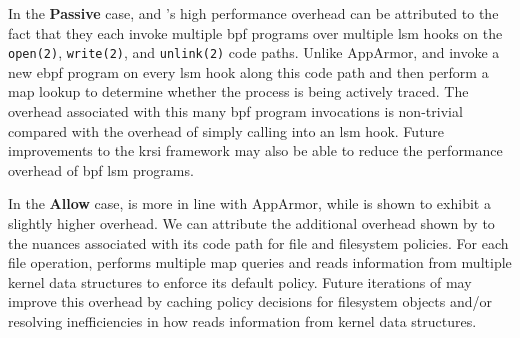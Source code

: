 

In the \textbf{Passive} case, \bpfbox{} and \bpfcontain{}'s high performance overhead can
be attributed to the fact that they each invoke multiple \gls{bpf} programs over multiple
\gls{lsm} hooks on the \texttt{open(2)}, \texttt{write(2)}, and \texttt{unlink(2)} code
paths. Unlike AppArmor, \bpfbox{} and \bpfcontain{} invoke a new \gls{ebpf} program on
every \gls{lsm} hook along this code path and then perform a map lookup to determine whether
the process is being actively traced. The overhead associated with this many \gls{bpf}
program invocations is non-trivial compared with the overhead of simply calling into an
\gls{lsm} hook. Future improvements to the \gls{krsi} framework may also be able to reduce
the performance overhead of \gls{bpf} \gls{lsm} programs.

In the \textbf{Allow} case, \bpfbox{} is more in line with AppArmor, while \bpfcontain{}
is shown to exhibit a slightly higher overhead. We can attribute the additional
overhead shown by \bpfcontain{} to the nuances associated with its code path for file and
filesystem policies. For each file operation, \bpfcontain{} performs multiple map queries
and reads information from multiple kernel data structures to enforce its default policy.
Future iterations of \bpfcontain{} may improve this overhead by caching policy decisions
for filesystem objects and/or resolving inefficiencies in how \bpfcontain{} reads
information from kernel data structures.

